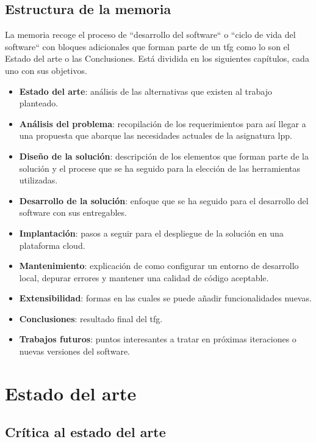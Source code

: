\documentclass[11pt,spanish,listoffigures,listoftables]{tfgetsinf}
\begin{document}
\section{Estructura de la memoria}

La memoria recoge el proceso de ``desarrollo del software`` o ``ciclo de vida del software`` con bloques adicionales que forman parte de un \acrshort{tfg} como lo son el Estado del arte o las Conclusiones. Está dividida en los siguientes capítulos, cada uno con sus objetivos.

\begin{itemize}
	\item \textbf{Estado del arte}: análisis de las alternativas que existen al trabajo planteado. 
	\item \textbf{Análisis del problema}: recopilación de los requerimientos para así llegar a una propuesta que abarque las necesidades actuales de la asignatura \acrshort{lpp}.
	\item \textbf{Diseño de la solución}: descripción de los elementos que forman parte de la solución y el procese que se ha seguido para la elección de las herramientas utilizadas.
	\item \textbf{Desarrollo de la solución}: enfoque que se ha seguido para el desarrollo del software con sus entregables.
	\item \textbf{Implantación}: pasos a seguir para el despliegue de la solución en una plataforma \foreignlanguage{english}{cloud}.
	\item \textbf{Mantenimiento}: explicación de como configurar un entorno de desarrollo local, depurar errores y mantener una calidad de código aceptable. 
	\item \textbf{Extensibilidad}: formas en las cuales se puede añadir funcionalidades nuevas.
	\item \textbf{Conclusiones}: resultado final del \acrshort{tfg}.
	\item \textbf{Trabajos futuros}: puntos interesantes a tratar en próximas iteraciones o nuevas versiones del software.
\end{itemize}

\chapter{Estado del arte}

\section{Crítica al estado del arte}
\end{document}
